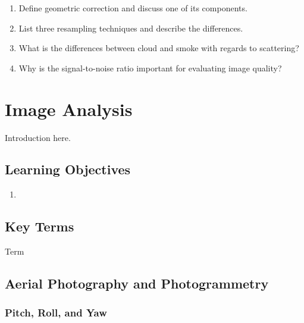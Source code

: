 \documentclass[
]{book}
\providecommand{\tightlist}{%
  \setlength{\itemsep}{0pt}\setlength{\parskip}{0pt}}
\begin{document}
\begin{enumerate}
\def\labelenumi{\arabic{enumi}.}
\tightlist
\item
  Define geometric correction and discuss one of its components.
\item
  List three resampling techniques and describe the differences.
\item
  What is the differences between cloud and smoke with regards to
  scattering?
\item
  Why is the signal-to-noise ratio important for evaluating image
  quality?
\end{enumerate}

\hypertarget{image-analysis}{%
\chapter{Image Analysis}\label{image-analysis}}

Introduction here.

\hypertarget{learning-objectives-13}{%
\section*{Learning Objectives}\label{learning-objectives-13}}

\begin{enumerate}
\def\labelenumi{\arabic{enumi}.}
\tightlist
\item
\end{enumerate}

\hypertarget{key-terms-13}{%
\section*{Key Terms}\label{key-terms-13}}

Term

\hypertarget{aerial-photography-and-photogrammetry}{%
\section{Aerial Photography and Photogrammetry}\label{aerial-photography-and-photogrammetry}}

\hypertarget{pitch-roll-and-yaw}{%
\subsection{Pitch, Roll, and Yaw}\label{pitch-roll-and-yaw}}
\end{document}
